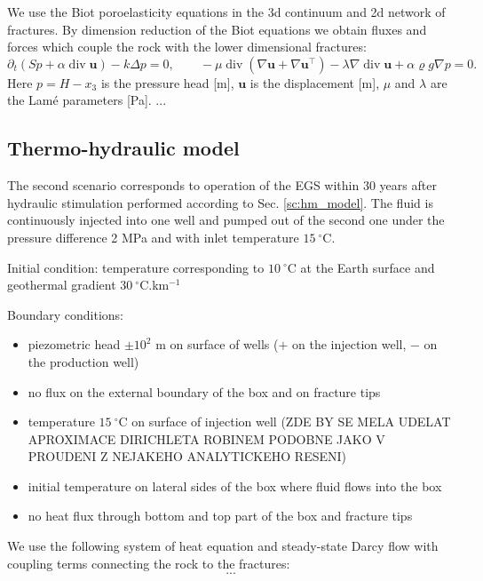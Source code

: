 \documentclass{article}
\renewcommand{\div}{\operatorname{div}}
\newcommand{\uu}{\vc u}
\newcommand{\vc}[1]{\boldsymbol{#1}}
\begin{document}
We use the Biot poroelasticity equations in the 3d continuum and 2d network of fractures. By dimension reduction of the Biot equations we obtain fluxes and forces which couple the rock with the lower dimensional fractures:
\[ \partial_t(Sp + \alpha\div\uu) - k\Delta p = 0,\qquad -\mu\div(\nabla\uu+\nabla\uu^\top) - \lambda\nabla\div\uu + \alpha\varrho g\nabla p = 0. \]
Here $p=H-x_3$ is the pressure head [m], $\uu$ is the displacement [m], $\mu$ and $\lambda$ are the Lamé parameters [Pa].
...


\subsection{Thermo-hydraulic model}

The second scenario corresponds to operation of the EGS within 30 years after hydraulic stimulation performed according to Sec. \ref{sc:hm_model}.
The fluid is continuously injected into one well and pumped out of the second one under the pressure difference 2 MPa and with inlet temperature $15\ ^\circ$C.

Initial condition:
temperature corresponding to $10\ ^\circ$C at the Earth surface and geothermal gradient $30\ ^\circ$C.km${}^{-1}$

Boundary conditions:
\begin{itemize}
\item piezometric head $\pm10^2$ m on surface of wells ($+$ on the injection well, $-$ on the production well)
\item no flux on the external boundary of the box and on fracture tips
\item temperature $15\ ^\circ$C on surface of injection well (ZDE BY SE MELA UDELAT APROXIMACE DIRICHLETA ROBINEM PODOBNE JAKO V PROUDENI Z NEJAKEHO ANALYTICKEHO RESENI)
\item initial temperature on lateral sides of the box where fluid flows into the box
\item no heat flux through bottom and top part of the box and fracture tips
\end{itemize}

We use the following system of heat equation and steady-state Darcy flow with coupling terms connecting the rock to the fractures:
\[ ... \]
\end{document}
